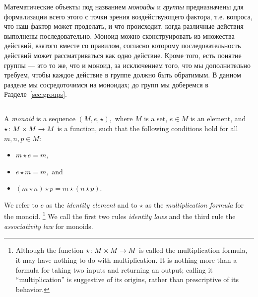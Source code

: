 \documentclass[CT4S-EN-RU]{subfiles}
\begin{document}
\begin{blockRUS}
Математические объекты под названием {\em моноиды} и {\em группы} предназначены для формализации всего этого с точки зрения воздействующего фактора, т.е. вопроса, что наш фактор может проделать, и что происходит, когда различные действия выполнены последовательно. Моноид можно сконструировать из множества действий, взятого вместе со правилом, согласно которому последовательность действий может рассматриваться как одно действие. Кроме того, есть понятие группы — это то же, что и моноид, за исключением того, что мы дополнительно требуем, чтобы каждое действие в группе должно быть обратимым. В данном разделе мы сосредоточимся на моноидах; до групп мы доберемся в Разделе~\ref{sec:groups}.
\end{blockRUS}


\subsection{}

\begin{definitionENG}[Monoid]\label{def:monoid}
A {\em monoid} is a sequence $(M,e,\star),$ where $M$ is a set, $e\in M$ is an element, and $\star\colon M\times M\rightarrow M$ is a function, such that the following conditions hold for all $m,n,p\in M$:
\begin{itemize}
\item $m\star e=m,$
\item $e\star m=m,$ and
\item $(m\star n)\star p=m\star(n\star p).$
\end{itemize}
We refer to $e$ as the {\em identity element} and to $\star$ as the {\em multiplication formula} for the monoid.%
\footnote{Although the function $\star\colon M\times M\rightarrow M$ is called the multiplication formula, it may have nothing to do with multiplication. It is nothing more than a formula for taking two inputs and returning an output; calling it “multiplication” is suggestive of its origins, rather than prescriptive of its behavior.}
We call the first two rules {\em identity laws} and the third rule the {\em associativity law} for monoids.
\end{definitionENG}
\end{document}
